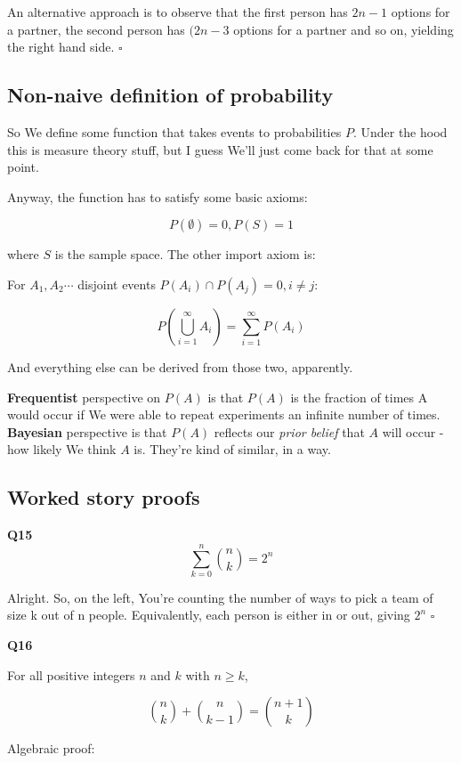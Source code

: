 \documentclass{article}
\begin{document}
		An alternative approach is to observe that the first person has $2n-1$ options for a partner, the second person has $(2n-3$ options for a partner and so on, yielding the right hand side. \hfill $\square$
		
	\subsection{Non-naive definition of probability}
	
		So We define some function that takes events to probabilities $P$. Under the hood this is measure theory stuff, but I guess We'll just come back for that at some point.
		
		Anyway, the function has to satisfy some basic axioms:
		
		$$P(\emptyset) = 0, P(S) = 1$$
		
		where $S$ is the sample space. The other import axiom is:
		
		For $A_1, A_2\cdots$ disjoint events $P(A_i) \cap P(A_j) = 0, i \neq j$:
		
		$$P\left(\bigcup^\infty_{i=1} A_i \right) = \sum^\infty_{i=1} P\left( A_i \right)$$
		
		And everything else can be derived from those two, apparently.
		
		\textbf{Frequentist} perspective on $P(A)$ is that $P(A)$ is the fraction of times A would occur if We were able to repeat experiments an infinite number of times. \textbf{Bayesian} perspective is that $P(A)$ reflects our \textit{prior belief} that $A$ will occur - how likely We think $A$ is. They're kind of similar, in a way.
		
	\subsection{Worked story proofs}
	
		\textbf{Q15}
			$$\sum^n_{k=0} {n \choose k} = 2^n$$
			
			Alright. So, on the left, You're counting the number of ways to pick a team of size k out of n people. Equivalently, each person is either in or out, giving $2^n$ \hfill$\square$
			
		\textbf{Q16}
		
			For all positive integers $n$ and $k$ with $n \ge k$,
			
			$${n \choose k} + {n \choose k-1} = {n + 1 \choose k} $$
			
			Algebraic proof: 
			
\end{document}
